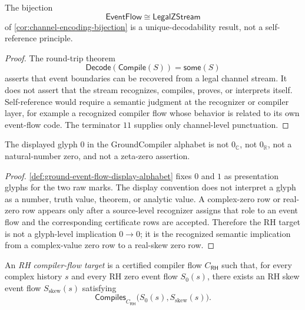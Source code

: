 \begin{proposition}
\label{prop:rh-channel-decodability-not-self-reference}
The bijection
$$
\mathsf{EventFlow}\cong\mathsf{LegalZStream}
$$
of \autoref{cor:channel-encoding-bijection} is a unique-decodability result,
not a self-reference principle.
\end{proposition}

\begin{proof}
The round-trip theorem
$$
\mathsf{Decode}(\mathsf{Compile}(S))=\mathsf{some}(S)
$$
asserts that event boundaries can be recovered from a legal channel stream.
It does not assert that the stream recognizes, compiles, proves, or interprets
itself.  Self-reference would require a semantic judgment at the recognizer or
compiler layer, for example a recognized compiler flow whose behavior is
related to its own event-flow code.  The terminator $11$ supplies only
channel-level punctuation.
\end{proof}

\begin{proposition}
\label{prop:rh-display-glyph-not-math-zero}
The displayed glyph $0$ in the GroundCompiler alphabet is not
$0_{\mathbb C}$, not $0_{\mathbb R}$, not a natural-number zero, and not a
zeta-zero assertion.
\end{proposition}

\begin{proof}
\autoref{def:ground-event-flow-display-alphabet} fixes $0$ and $1$ as
presentation glyphs for the two raw marks.  The display convention does not
interpret a glyph as a number, truth value, theorem, or analytic value.  A
complex-zero row or real-zero row appears only after a source-level recognizer
assigns that role to an event flow and the corresponding certificate rows are
accepted.  Therefore the RH target is not a glyph-level implication
$0\to 0$; it is the recognized semantic implication from a complex-value zero
row to a real-skew zero row.
\end{proof}

\begin{definition}
\label{def:rh-compiler-flow-target}
An \emph{RH compiler-flow target} is a certified compiler flow
$C_{\mathsf{RH}}$ such that, for every complex history $s$ and every RH zero
event flow $S_0(s)$, there exists an RH skew event flow
$S_{\mathrm{skew}}(s)$ satisfying
$$
\mathsf{Compiles}_{C_{\mathsf{RH}}}
\bigl(S_0(s),S_{\mathrm{skew}}(s)\bigr).
$$
\end{definition}

